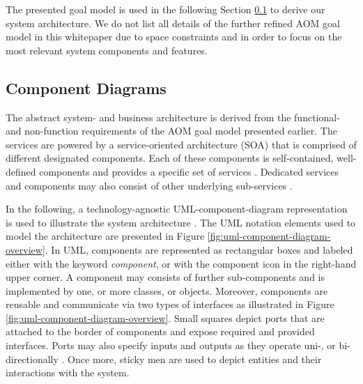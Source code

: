 \documentclass{llncs}
\begin{document}
{			The presented goal model is used in the following Section \ref{ss:component-diagrams} to derive our system architecture. We do not list all details of the further refined AOM goal model in this whitepaper due to space constraints and in order to focus on the most relevant system components and features.
									

		
		\subsection{Component Diagrams}
			\label{ss:component-diagrams}

			The abstract system- and business architecture is derived from the functional- and non-function requirements of the AOM goal model presented earlier. The services are powered by a service-oriented architecture (SOA) that is comprised of different designated components. Each of these components is self-contained, well-defined components and provides a specific set of services \cite{erl2005service}\cite{perrey2003service}. Dedicated services and components may also consist of other underlying sub-services \cite{rosen2012applied}. 
			
			In the following, a technology-agnostic UML-component-diagram representation is used to illustrate the system architecture \cite{booch1996unified}\cite{specification2007omg}. The UML notation elements used to model the architecture are presented in Figure \ref{fig:uml-component-diagram-overview}. In UML, components are represented as rectangular boxes and labeled either with the keyword \textit{component}, or with the component icon in the right-hand upper corner. A component may consists of further sub-components and is implemented by one, or more classes, or objects. Moreover, components are reusable and communicate via two types of interfaces as illustrated in Figure \ref{fig:uml-component-diagram-overview}. Small squares depict ports that are attached to the border of components and expose required and provided interfaces. Ports may also specify inputs and outputs as they operate uni-, or bi-directionally \cite{booch1996unified}\cite{specification2007omg}. Once more, sticky men are used to depict entities and their interactions with the system. 
			
}
\end{document}
